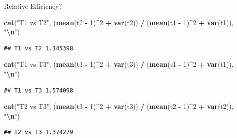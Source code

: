 \documentclass[
  ignorenonframetext,
]{beamer}
\newenvironment{Shaded}{\begin{snugshade}}{\end{snugshade}}
\newcommand{\DecValTok}[1]{\textcolor[rgb]{0.00,0.00,0.81}{#1}}
\newcommand{\FunctionTok}[1]{\textcolor[rgb]{0.13,0.29,0.53}{\textbf{#1}}}
\newcommand{\NormalTok}[1]{#1}
\newcommand{\SpecialCharTok}[1]{\textcolor[rgb]{0.81,0.36,0.00}{\textbf{#1}}}
\newcommand{\StringTok}[1]{\textcolor[rgb]{0.31,0.60,0.02}{#1}}
\begin{document}
\begin{frame}[fragile]{Relative Efficiency?}
\protect{}\label{relative-efficiency}
\begin{Shaded}
\begin{Highlighting}[]
\FunctionTok{cat}\NormalTok{(}\StringTok{"T1 vs T2"}\NormalTok{, (}\FunctionTok{mean}\NormalTok{(t2 }\SpecialCharTok{{-}} \DecValTok{1}\NormalTok{)}\SpecialCharTok{\^{}}\DecValTok{2} \SpecialCharTok{+} \FunctionTok{var}\NormalTok{(t2)) }\SpecialCharTok{/}
\NormalTok{  (}\FunctionTok{mean}\NormalTok{(t1 }\SpecialCharTok{{-}} \DecValTok{1}\NormalTok{)}\SpecialCharTok{\^{}}\DecValTok{2} \SpecialCharTok{+} \FunctionTok{var}\NormalTok{(t1)), }\StringTok{"}\SpecialCharTok{\textbackslash{}n}\StringTok{"}\NormalTok{)}
\end{Highlighting}
\end{Shaded}

\begin{verbatim}
## T1 vs T2 1.145398
\end{verbatim}

\begin{Shaded}
\begin{Highlighting}[]
\FunctionTok{cat}\NormalTok{(}\StringTok{"T1 vs T3"}\NormalTok{, (}\FunctionTok{mean}\NormalTok{(t3 }\SpecialCharTok{{-}} \DecValTok{1}\NormalTok{)}\SpecialCharTok{\^{}}\DecValTok{2} \SpecialCharTok{+} \FunctionTok{var}\NormalTok{(t3)) }\SpecialCharTok{/}
\NormalTok{  (}\FunctionTok{mean}\NormalTok{(t1 }\SpecialCharTok{{-}} \DecValTok{1}\NormalTok{)}\SpecialCharTok{\^{}}\DecValTok{2} \SpecialCharTok{+} \FunctionTok{var}\NormalTok{(t1)), }\StringTok{"}\SpecialCharTok{\textbackslash{}n}\StringTok{"}\NormalTok{)}
\end{Highlighting}
\end{Shaded}

\begin{verbatim}
## T1 vs T3 1.574098
\end{verbatim}

\begin{Shaded}
\begin{Highlighting}[]
\FunctionTok{cat}\NormalTok{(}\StringTok{"T2 vs T3"}\NormalTok{, (}\FunctionTok{mean}\NormalTok{(t3 }\SpecialCharTok{{-}} \DecValTok{1}\NormalTok{)}\SpecialCharTok{\^{}}\DecValTok{2} \SpecialCharTok{+} \FunctionTok{var}\NormalTok{(t3)) }\SpecialCharTok{/}
\NormalTok{  (}\FunctionTok{mean}\NormalTok{(t2 }\SpecialCharTok{{-}} \DecValTok{1}\NormalTok{)}\SpecialCharTok{\^{}}\DecValTok{2} \SpecialCharTok{+} \FunctionTok{var}\NormalTok{(t2)), }\StringTok{"}\SpecialCharTok{\textbackslash{}n}\StringTok{"}\NormalTok{)}
\end{Highlighting}
\end{Shaded}

\begin{verbatim}
## T2 vs T3 1.374279
\end{verbatim}
\end{frame}
\end{document}
